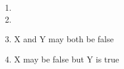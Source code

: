 \documentclass[11pt]{article}
\begin{document}
\begin{enumerate}
    \item 
    \item 
    \item X and Y may both be false
    \item X may be false but Y is true
\end{enumerate}
\end{document}
